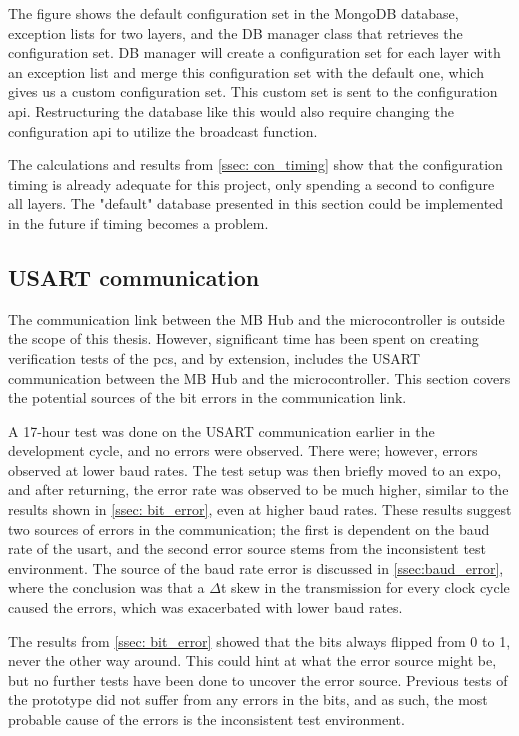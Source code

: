 \documentclass[main.tex]{subfiles}
\begin{document}
The figure shows the default configuration set in the MongoDB database, exception lists for two layers, and the DB manager class that retrieves the configuration set. DB manager will create a configuration set for each layer with an exception list and merge this configuration set with the default one, which gives us a custom configuration set. This custom set is sent to the configuration \gls{api}. Restructuring the database like this would also require changing the configuration \gls{api} to utilize the broadcast function.

The calculations and results from \autoref{ssec: con_timing} show that the configuration timing is already adequate for this project, only spending a second to configure all layers. The "default" database presented in this section could be implemented in the future if timing becomes a problem.


 
 
\subsection{USART communication}

The communication link between the MB Hub and the microcontroller is outside the scope of this thesis. However, significant time has been spent on creating verification tests of the \gls{pcs}, and by extension, includes the USART communication between the MB Hub and the microcontroller. This section covers the potential sources of the bit errors in the communication link.

A 17-hour test was done on the USART communication earlier in the development cycle, and no errors were observed. There were; however, errors observed at lower baud rates. The test setup was then briefly moved to an expo, and after returning, the error rate was observed to be much higher, similar to the results shown in \autoref{ssec: bit_error}, even at higher baud rates. These results suggest two sources of errors in the communication; the first is dependent on the baud rate of the \gls{usart}, and the second error source stems from the inconsistent test environment. 
The source of the baud rate error is discussed in \autoref{ssec:baud_error}, where the conclusion was that a $\Delta$t skew in the transmission for every clock cycle caused the errors, which was exacerbated with lower baud rates.

The results from \autoref{ssec: bit_error} showed that the bits always flipped from 0 to 1, never the other way around. This could hint at what the error source might be, but no further tests have been done to uncover the error source. Previous tests of the prototype did not suffer from any errors in the bits, and as such, the most probable cause of the errors is the inconsistent test environment.
\end{document}
